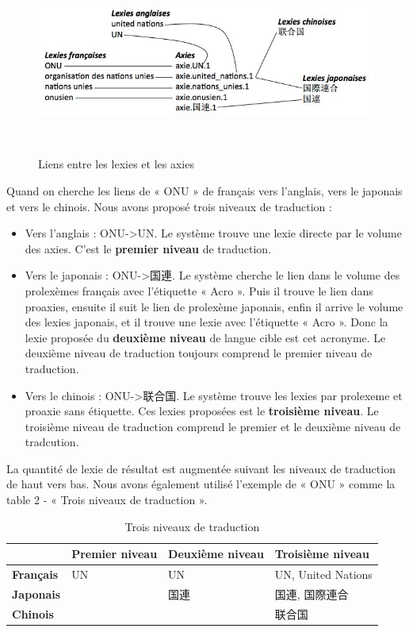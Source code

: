 \documentclass[10pt,a4paper,twoside]{article}
\newcommand{\Chinois}[1]{{\fontspec[Scale=0.9]{STSong}#1}}
\newcommand{\Japonais}[1]{{\fontspec[Scale=0.9]{Hiragino Kaku Gothic Pro}#1}}
\begin{document}
\begin{figure}[htbp] 
\begin{center} 
\includegraphics[width=14cm]{images/lexies-axies.jpg}
\end{center} 
\caption{Liens entre les lexies et les axies} \label{image} \
\end{figure}

Quand on cherche les liens de « ONU » de français vers l’anglais,  vers le japonais et vers le chinois. Nous avons proposé trois niveaux de traduction :\\

\begin{itemize}
\item Vers l’anglais : ONU->UN. Le système trouve une lexie directe par le volume des axies. C’est le \textbf{premier niveau} de traduction.
\item Vers le japonais : ONU->\Japonais{国連}. Le système cherche le lien dans le volume des prolexèmes français avec l’étiquette « Acro ». Puis il trouve le lien dans proaxies, ensuite il suit le lien de prolexème japonais, enfin il arrive le volume des lexies japonais, et il trouve une lexie avec l’étiquette « Acro ». Donc la lexie proposée du \textbf{deuxième niveau} de langue cible est cet acronyme.  Le deuxième niveau de traduction toujours comprend le premier niveau de traduction.
\item Vers le chinois : ONU->\Chinois{联合国}.  Le système trouve les lexies par prolexeme et proaxie sans étiquette. Ces lexies proposées est le \textbf{troisième niveau}. Le troisième niveau de traduction comprend le premier et le deuxième niveau de tradcution.
\end{itemize}
La quantité de lexie de résultat est augmentée suivant les niveaux de traduction de haut vers bas. Nous avons également utilisé l’exemple de « ONU » comme la table 2 - « Trois niveaux de traduction ».\\

\begin{table}[!h]
\centering
	\begin{tabular}{|l|l|l|l|}
	\hline
	\textbf{} & \textbf{Premier niveau} & \textbf{Deuxième niveau} & \textbf{Troisième niveau} \\
	\hline
	\textbf{Français} & UN & UN & UN, United Nations \\
	\hline
	\textbf{Japonais} &  & \Japonais{国連} &\Japonais{国連}, \Japonais{国際連合} \\
	\hline
	\textbf{Chinois} & & &\Chinois{联合国}  \\
	\hline
	\end{tabular}
\caption{ Trois niveaux de traduction }\label{table}
\end{table}
\end{document}
